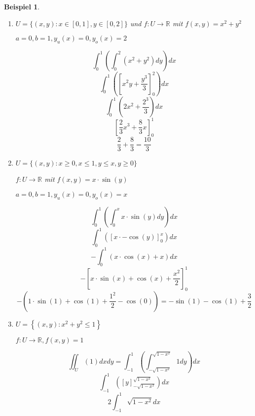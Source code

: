 \documentclass[fontset=ubuntu,12pt,a4paper]{scrreprt}
\newtheorem{beispiel}[defi]{Beispiel}
\begin{document}
    \begin{beispiel}
        \begin{enumerate}[label=\emph{(\roman*)}]

            \item \(U=\{(x,y):x \in [0,1], y \in [0,2]\}\) und \(f:U\to\mathbb{R}\) mit \(f(x,y)=x^2+y^2\)

                \(a=0,b=1,y_u(x)=0,y_o(x)=2\)

                \[\int^1_0 \left(\int^{2}_{0} (x^2+y^2)dy\right)dx\]
                \[\int^1_0 \left({\left[x^2y+\frac{y^3}{3}\right]}^{2}_{0}\right)dx\]
                \[\int^1_0 \left(2x^2+\frac{2^3}{3}\right)dx\]
                \[{\left[\frac{2}{3}x^3+\frac{8}{3}x\right]}^1_0\]
                \[\frac{2}{3}+\frac{8}{3}=\frac{10}{3}\]

        \item \(U=\{(x,y):x \geq 0, x \leq 1, y \leq x, y \geq 0\}\)

            \(f:U\to\mathbb{R}\) mit \(f(x,y)=x\cdot\sin(y)\)

            \(a=0,b=1,y_u(x)=0,y_o(x)=x\)

            \[\int^1_0 \left(\int^{x}_{0} x\cdot\sin(y)dy\right)dx\]
            \[\int^1_0 \left({\left[x\cdot-\cos(y)\right]}^{x}_{0}\right)dx\]
            \[-\int^1_0 \left(x\cdot\cos(x)+x\right)dx\]
            \[-{\left[x\cdot\sin(x)+\cos(x)+\frac{x^2}{2}\right]}^1_0\]
            \[-\left(1\cdot\sin(1)+\cos(1)+\frac{1^2}{2}-\cos(0)\right)=-\sin(1)-\cos(1)+\frac{3}{2}\]

        \item \(U=\left\{(x,y):x^2+y^2\le1\right\}\)
        
        \(f:U\to\mathbb{R},f(x,y)=1\)


        \[\iint_U\left(1\right)dxdy=\int_{-1}^1 \left(\int_{-\sqrt{1-x^2}}^{\sqrt{1-x^2}}1dy\right)dx\]
        \[\int_{-1}^1 \left({\left[y\right]}_{-\sqrt{1-x^2}}^{\sqrt{1-x^2}}\right)dx\]
        \[2\int_{-1}^1 \sqrt{1-x^2}dx\]


\end{enumerate}
\end{beispiel}
\end{document}
